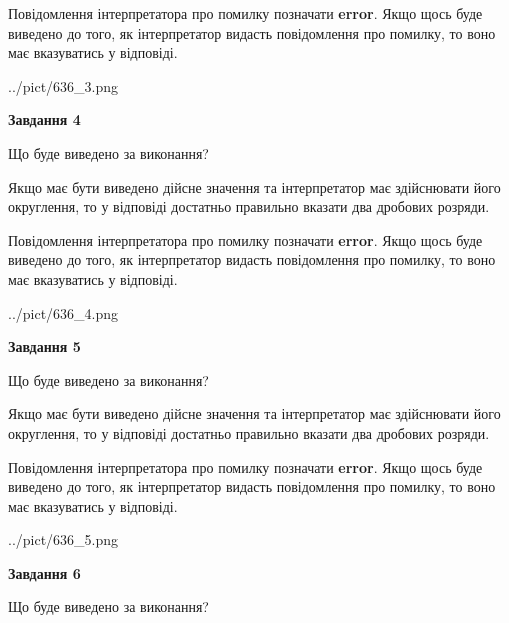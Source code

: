 \documentclass[12pt, ukrainian]{article}
\begin{document}
{\begin {Large}
Повідомлення інтерпретатора про помилку позначати \textbf{error}.
Якщо щось буде виведено до того, як інтерпретатор видасть повідомлення про помилку, 
то воно має вказуватись у відповіді. \par

\begin{center}
	{../pict/636_3.png}
\end{center}
\newpage

{\begin {center}\textbf{Завдання 4}\end {center}}\par
Що буде виведено за виконання? \par

Якщо має бути виведено дійсне значення та інтерпретатор має здійснювати його округлення, 
то у відповіді достатньо правильно вказати два дробових розряди.

Повідомлення інтерпретатора про помилку позначати \textbf{error}.
Якщо щось буде виведено до того, як інтерпретатор видасть повідомлення про помилку, 
то воно має вказуватись у відповіді. \par

\begin{center}
	{../pict/636_4.png}
\end{center}
\newpage

{\begin {center}\textbf{Завдання 5}\end {center}}\par
Що буде виведено за виконання? \par

Якщо має бути виведено дійсне значення та інтерпретатор має здійснювати його округлення, 
то у відповіді достатньо правильно вказати два дробових розряди.

Повідомлення інтерпретатора про помилку позначати \textbf{error}.
Якщо щось буде виведено до того, як інтерпретатор видасть повідомлення про помилку, 
то воно має вказуватись у відповіді. \par

\begin{center}
	{../pict/636_5.png}
\end{center}
\newpage

{\begin {center}\textbf{Завдання 6}\end {center}}\par
Що буде виведено за виконання? \par


\end{Large}}
\end{document}
